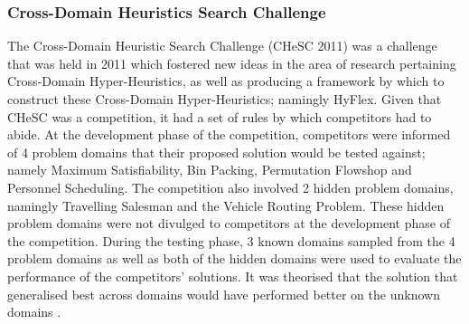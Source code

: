 \documentclass[a4paper,12pt]{article}
\begin{document}
            \subsubsection{Cross-Domain Heuristics Search Challenge}
                \par{
                    The Cross-Domain Heuristic Search Challenge (CHeSC 2011)\cite{chesc} was a challenge
                    that was held in 2011 which fostered new ideas in the area of research pertaining
                    Cross-Domain Hyper-Heuristics, as well as producing a framework by which
                    to construct these Cross-Domain Hyper-Heuristics; namingly HyFlex\cite{hyflex2012}.\newline 
                    \newline 
                    Given that CHeSC was a competition, it had a set of rules by which competitors
                    had to abide. At the development phase of the competition, competitors were
                    informed of 4 problem domains that their proposed solution would be tested
                    against; namely Maximum Satisfiability, Bin Packing, Permutation Flowshop
                    and Personnel Scheduling. The competition also involved 2 hidden problem domains, 
                    namingly Travelling Salesman and the Vehicle Routing Problem. These
                    hidden problem domains were not divulged to competitors at the development
                    phase of the competition.\newline 
                    \newline 
                    During the testing phase, 3 known domains sampled from the 4 problem domains 
                    as well as both of the hidden domains were used to evaluate the performance 
                    of the competitors’ solutions. It was theorised that the solution that
                    generalised best across domains would have performed better on the unknown
                    domains \cite{hhcds}.
                }
\end{document}
